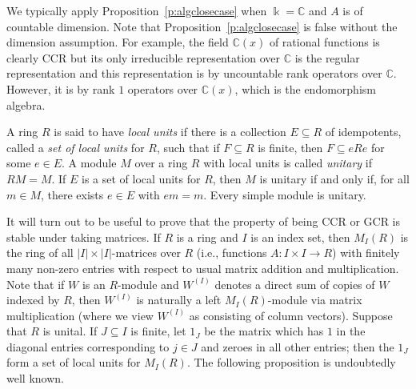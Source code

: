 \documentclass[11pt,reqno]{amsart}
\theoremstyle{plain}
\numberwithin{equation}{section}
\begin{document}
We typically apply Proposition~\ref{p:algclosecase} when $\Bbbk=\mathbb C$ and $A$ is of countable dimension.  Note that Proposition~\ref{p:algclosecase} is false without the dimension assumption.  For example, the field $\mathbb C(x)$ of rational functions is clearly CCR but its only irreducible representation over $\mathbb C$ is the regular representation and this representation is by uncountable rank operators over $\mathbb C$.  However, it is by rank $1$ operators over $\mathbb C(x)$, which is the endomorphism algebra.

A ring $R$ is said to have \emph{local units} if there is a collection $E\subseteq R$ of idempotents, called a \emph{set of local units} for $R$, such that if $F\subseteq R$ is finite, then $F\subseteq eRe$ for some $e\in E$.
A module $M$ over a ring $R$ with local units is called \emph{unitary} if $RM=M$.  If $E$ is  a set of local units for $R$, then $M$ is unitary if and only if, for all $m\in M$, there exists $e\in E$ with $em=m$.  Every simple module is unitary.

It will turn out to be useful to prove that the property of being CCR or GCR is stable under taking matrices.  If $R$ is a ring and $I$ is an index set, then $M_I(R)$ is the ring of all $|I|\times |I|$-matrices over $R$ (i.e., functions $A\colon I\times I\to R$) with finitely many non-zero entries with respect to usual matrix addition and multiplication.  Note that if $W$ is an $R$-module and $W^{(I)}$ denotes a direct sum of copies of $W$ indexed by $R$, then $W^{(I)}$ is naturally a left $M_I(R)$-module via matrix multiplication (where we view $W^{(I)}$ as consisting of column vectors).  Suppose that $R$ is unital.  If $J\subseteq I$ is finite, let $1_J$ be the matrix which has $1$ in the diagonal entries corresponding to $j\in J$ and zeroes in all other entries;  then the $1_J$ form a set of local units for $M_I(R)$.   The following proposition is undoubtedly well known.
\end{document}
